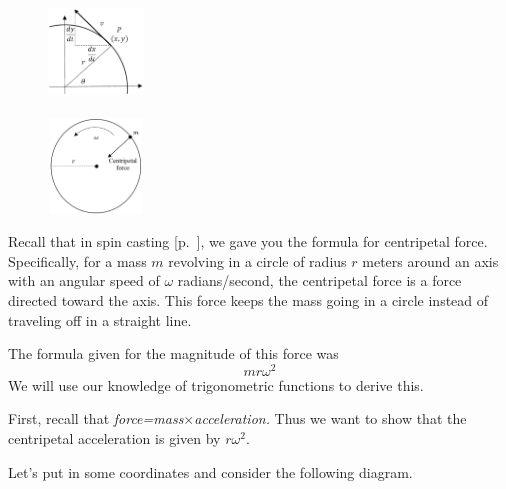\begin{embeddedproblem}{}

\begin{figure}
\captionsetup{labelformat=empty}
\centerline{\includegraphics*[height=1in,width=1in]{Figures/Centripetal1}}
\label{fig:Centripetal1}
\end{figure}
\begin{figure}
\captionsetup{labelformat=empty}
\centerline{\includegraphics*[height=1in,width=1in]{Figures/SpinCasting5}}
\label{fig:SpinCasting5}
\end{figure}
  Recall that in spin casting [p.~\pageref{SpinCasting}], we gave you
  the formula for centripetal force.  Specifically, for a mass $m$
  revolving in a circle of radius $r$ meters around an axis with an
  angular speed of $\omega$ radians/second, the centripetal force is a force
  directed toward the axis.  This force keeps the mass going in a
  circle instead of traveling off in a straight line.    


The formula given for the magnitude of this force was
$$
mr\omega^2
$$
We will use our knowledge of trigonometric functions to 
derive this.

First, recall that \emph{force=mass$\times$acceleration.}  Thus we want to
show that the centripetal acceleration is given by $r\omega^2.$

Let's put in some coordinates and consider the following diagram.


\end{embeddedproblem}
